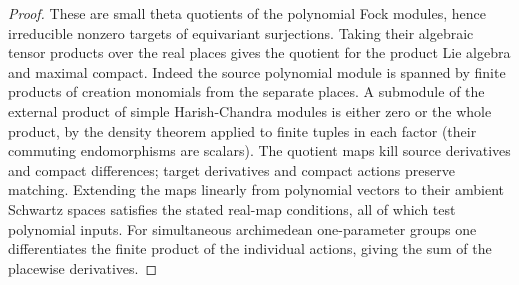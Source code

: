 \begin{proof}
These are small theta quotients of the polynomial Fock modules,
hence irreducible nonzero targets of equivariant surjections.
Taking their algebraic tensor products over the real places gives
the quotient for the product Lie algebra and maximal compact.
Indeed the source polynomial module is spanned by finite products
of creation monomials from the separate places. A submodule of the
external product of simple Harish-Chandra modules is either zero
or the whole product, by the density theorem applied to finite
tuples in each factor (their commuting endomorphisms are scalars).
The quotient maps kill source derivatives and compact differences;
target derivatives and compact actions preserve matching. Extending
the maps linearly from polynomial vectors to their ambient
Schwartz spaces satisfies the stated real-map conditions, all of
which test polynomial inputs. For simultaneous archimedean
one-parameter groups one differentiates the finite product of
the individual actions, giving the sum of the placewise derivatives.
\end{proof}

